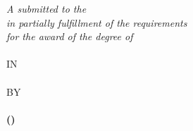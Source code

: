 \begin{titlepage}
\begin{center}



{\LARGE \bfseries \ReportTitel \par}\vspace{0.1cm} %

%
\vfill

\large \textit{A \rType submitted to the \Uni}\\[0cm] %
\large \textit{in partially fulfillment of the requirements}\\[0cm]
\large \textit{for the award of the degree of}\\[0cm]

\textbf{\Degree}\\[0cm]

\uppercase{In}\\[0cm]

\uppercase{\textbf{\Cour}}\\[0cm]

\uppercase{By}\\[0cm]

\uppercase{\textbf{\fAuthorC \\[0cm] (\fAID)}}\\[0cm]


\end{center}
\end{titlepage}
